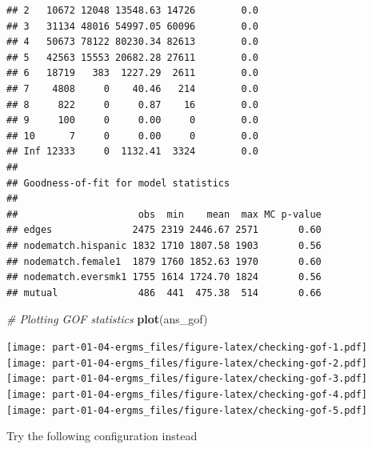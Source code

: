 \documentclass[
]{book}
\newenvironment{Shaded}{\begin{snugshade}}{\end{snugshade}}
\newcommand{\CommentTok}[1]{\textcolor[rgb]{0.56,0.35,0.01}{\textit{#1}}}
\newcommand{\FunctionTok}[1]{\textcolor[rgb]{0.13,0.29,0.53}{\textbf{#1}}}
\newcommand{\NormalTok}[1]{#1}
\begin{document}
\begin{verbatim}
## 2   10672 12048 13548.63 14726        0.0
## 3   31134 48016 54997.05 60096        0.0
## 4   50673 78122 80230.34 82613        0.0
## 5   42563 15553 20682.28 27611        0.0
## 6   18719   383  1227.29  2611        0.0
## 7    4808     0    40.46   214        0.0
## 8     822     0     0.87    16        0.0
## 9     100     0     0.00     0        0.0
## 10      7     0     0.00     0        0.0
## Inf 12333     0  1132.41  3324        0.0
## 
## Goodness-of-fit for model statistics 
## 
##                     obs  min    mean  max MC p-value
## edges              2475 2319 2446.67 2571       0.60
## nodematch.hispanic 1832 1710 1807.58 1903       0.56
## nodematch.female1  1879 1760 1852.63 1970       0.60
## nodematch.eversmk1 1755 1614 1724.70 1824       0.56
## mutual              486  441  475.38  514       0.66
\end{verbatim}

\begin{Shaded}
\begin{Highlighting}[]
\CommentTok{\# Plotting GOF statistics}
\FunctionTok{plot}\NormalTok{(ans\_gof)}
\end{Highlighting}
\end{Shaded}

\texttt{[image: part-01-04-ergms\_files/figure-latex/checking-gof-1.pdf]} \texttt{[image: part-01-04-ergms\_files/figure-latex/checking-gof-2.pdf]} \texttt{[image: part-01-04-ergms\_files/figure-latex/checking-gof-3.pdf]} \texttt{[image: part-01-04-ergms\_files/figure-latex/checking-gof-4.pdf]} \texttt{[image: part-01-04-ergms\_files/figure-latex/checking-gof-5.pdf]}

Try the following configuration instead
\end{document}
